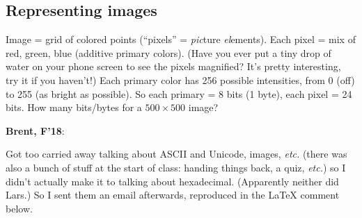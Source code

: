\documentclass{article}
\newenvironment{reflect}[1]
{
  \noindent
  \begin{lrbox}{\reflectbox}
    \begin{minipage}[t]{\textwidth}
      \textbf{#1}:
}{
    \end{minipage}
  \end{lrbox}
  \fbox{\usebox{\reflectbox}}
}
\begin{document}
\subsection*{Representing images}

Image = grid of colored points (``pixels'' = \emph{pic}ture
\emph{el}ements).  Each pixel = mix of red, green, blue (additive
primary colors). (Have you ever put a tiny drop of water on your phone
screen to see the pixels magnified?  It's pretty interesting, try it
if you haven't!) Each primary color has 256 possible intensities, from
0 (off) to 255 (as bright as possible).  So each primary = 8 bits (1
byte), each pixel = 24 bits.  How many bits/bytes for a
$500 \times 500$ image?

\begin{reflect}{Brent, F'18}
  Got too carried away talking about ASCII and Unicode, images,
  \emph{etc.} (there was also a bunch of stuff at the start of class:
  handing things back, a quiz, \emph{etc.}) so I didn't actually make
  it to talking about hexadecimal.  (Apparently neither did Lars.)  So
  I sent them an email afterwards, reproduced in the LaTeX comment below.
\end{reflect}








\end{document}
